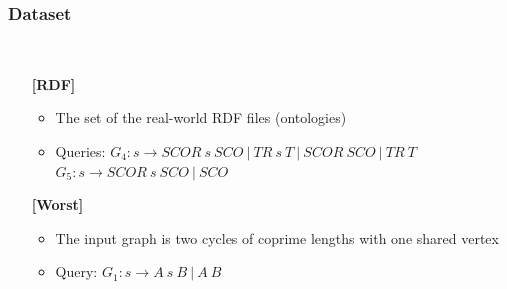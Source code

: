 \documentclass[xcolor=table]{beamer}
\begin{document}
\begin{frame}[fragile] \frametitle{Dataset}
  \begin{minipage}[t]{1cm}
\hspace{1cm}
  \end{minipage}
  ~
\begin{minipage}[t]{0.85\textwidth}
\begin{itemize}
\item[\textbf{[RDF]}]
\begin{itemize}
  \item The set of the real-world RDF files (ontologies)
  \item Queries: $G_4: s \to SCOR \ s \ SCO \ | \ TR \ s \ T \ | \ SCOR \ SCO \ | \ TR \ T$
$G_5: s \to SCOR \ s \ SCO \ | \ SCO$
\end{itemize}

\pause
\item[\textbf{[Worst]}]
\begin{itemize}
  \item The input graph is two cycles of coprime lengths with one shared vertex
  \begin{figure}
\end{figure}
  \item Query: $G_1: s \to A \ s \ B \ | \ A \ B$
\end{itemize}
\end{itemize}
\end{minipage}
\end{frame}
\end{document}
